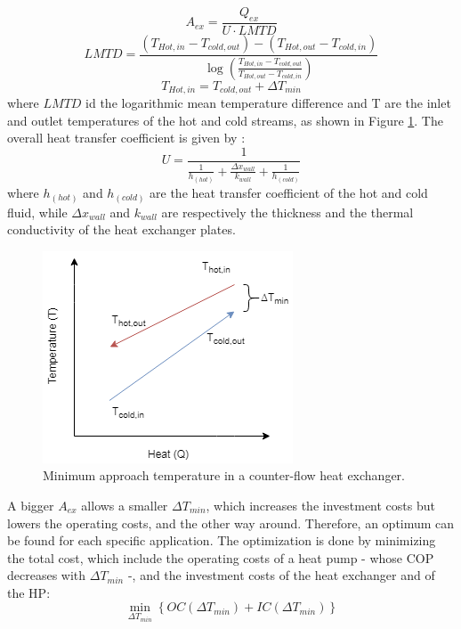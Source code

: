 \documentclass{article}
\begin{document}
\begin{equation}\label{eq:HEX_area}
A_{ex} = \frac{Q_{ex}}{U \cdot LMTD}
\end{equation}
\begin{equation}\label{eq:LMTD}
LMTD= \frac{(T_{Hot,in } - T_{cold,out }) - (T_{Hot,out } - T_{cold,in }) }{ \log{ (\frac{T_{Hot,in } - T_{cold,out }}{T_{Hot,out } - T_{cold,in }} ) }}
\end{equation}
\begin{equation}
	T_{Hot,in } = T_{cold,out} + \Delta T_{min}
\end{equation}
where  $LMTD$ id the logarithmic mean temperature difference and T are the inlet and outlet temperatures of the hot and cold streams, as shown in Figure \ref{fig:dtmin}. The overall heat transfer coefficient is given by \cite{huExtremumSeekingControl2015}:
\begin{equation}\label{eq:alpha}
U= \frac{1}{ \frac{1}{h_{(hot)} } + \frac{\Delta x_{wall}}{k_{wall}} + \frac{1}{h_{(cold)}} }
\end{equation}
where $h_{(hot)}$ and $h_{(cold)}$ are the heat transfer coefficient of the hot and cold fluid, while $\Delta x_{wall}$ and $k_{wall}$ are respectively the thickness and the thermal conductivity of the heat exchanger plates.

\begin{figure}[htp]
	\centering
	\includegraphics[scale=0.6]{Images/dtmin.png}
	\caption{Minimum approach temperature in a counter-flow heat exchanger.}
	\label{fig:dtmin}
\end{figure}

A bigger $A_{ex}$ allows a smaller $\Delta T_{min}$, which increases the investment costs but lowers the operating costs, and the other way around. Therefore, an optimum can be found for each specific application. 
The optimization is done by minimizing the total cost, which include the operating costs of a heat pump - whose COP decreases with $\Delta T_{min}$ -, and the investment costs of the heat exchanger and of the HP:
\begin{equation}
	\min_{\Delta T_{min}}\left\lbrace OC(\Delta T_{min}) + IC(\Delta T_{min}) \right\rbrace 
\end{equation}
\end{document}
